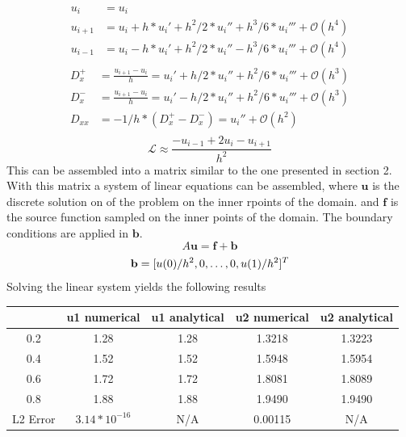 \documentclass{article}
\begin{document}
\begin{align}
    u_i &= u_i\\
    u_{i+1} &= u_i + h * u_i' + h^2/2 * u_i'' + h^3/6 * u_i''' + \mathcal{O}\left(h^4\right)\\
    u_{i-1} &= u_i - h * u_i' + h^2/2 * u_i'' - h^3/6 * u_i''' + \mathcal{O}\left(h^4\right)\\
\end{align}
\begin{align}
    D_x^+ &= \frac{u_{i+1}-u_i}{h} = u_i' + h/2 * u_i'' + h^2/6 * u_i''' + \mathcal{O}\left(h^3\right)\\
    D_x^- &= \frac{u_{i+1}-u_i}{h} = u_i' - h/2 * u_i'' + h^2/6 * u_i''' + \mathcal{O}\left(h^3\right)\\
    D_{xx} &= -1/h*\left(D_x^+ - D_x^-\right) = u_i'' + \mathcal{O}\left(h^2\right)\\
\end{align}
\begin{equation}
    \mathcal{L} \approx \frac{-u_{i-1}+2u_i-u_{i+1}}{h^2}
\end{equation}
This can be assembled into a matrix similar to the one presented in section 2. With this matrix a system of linear equations can be assembled, where $\mathbf{u}$ is the discrete solution on of the problem on the inner rpoints of the domain. and $\mathbf{f}$ is the source function sampled on the inner points of the domain. The boundary conditions are applied in $\mathbf{b}$.
\begin{equation}
    A\mathbf{u} = \mathbf{f}+\mathbf{b}
\end{equation}
\begin{equation}
    \mathbf{b} = [u(0)/h^2, 0, \dots, 0, u(1)/h^2]^T\\
\end{equation}
Solving the linear system yields the following results
\begin{table}[H]
    \centering
    \begin{tabular}{c|c|c|c|c}
        & u1 numerical & u1 analytical & u2 numerical & u2 analytical \\ \hline
        0.2 & 1.28 & 1.28 & 1.3218 & 1.3223 \\ \hline
        0.4 & 1.52 & 1.52 & 1.5948 & 1.5954 \\ \hline
        0.6 & 1.72 & 1.72 & 1.8081 & 1.8089 \\ \hline
        0.8 & 1.88 & 1.88 & 1.9490 & 1.9490 \\ \hline
        L2 Error& $3.14 * 10^{-16}$ & N/A &0.00115 & N/A
        
    \end{tabular}
\end{table}
\end{document}

